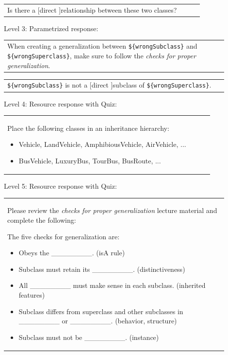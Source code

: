 \begin{tabular}{|p{0.9\linewidth}}
Is there a [direct ]relationship between these two classes?
\end{tabular} \medskip

\noindent Level 3: Parametrized response: \medskip

\begin{tabular}{|p{0.9\linewidth}}
When creating a generalization between \verb|${wrongSubclass}| and \verb|${wrongSuperclass}|, make sure to follow the \textit{checks for proper generalization}.
\end{tabular} \medskip

\begin{tabular}{|p{0.9\linewidth}}
\verb|${wrongSubclass}| is not a [direct ]subclass of \verb|${wrongSuperclass}|.
\end{tabular} \medskip

\noindent Level 4: Resource response with Quiz: \medskip

\begin{tabular}{|p{0.9\linewidth}}
Place the following classes in an inheritance hierarchy:

\begin{itemize}
    \item Vehicle, LandVehicle, AmphibiousVehicle, AirVehicle, ...
    \item BusVehicle, LuxuryBus, TourBus, BusRoute, ...
\end{itemize}

\end{tabular} \medskip

\noindent Level 5: Resource response with Quiz: \medskip

\begin{tabular}{|p{0.9\linewidth}}
Please review the \textit{checks for proper generalization} lecture material
and complete the following:

The five checks for generalization are:
\begin{itemize}
    \item Obeys the \_\_\_\_\_\_\_\_. (isA rule)
    \item Subclass must retain its \_\_\_\_\_\_\_\_. (distinctiveness)
    \item All \_\_\_\_\_\_\_\_ must make sense in each subclass. (inherited features)
    \item Subclass differs from superclass and other subclasses in \_\_\_\_\_\_\_\_ or \_\_\_\_\_\_\_\_. (behavior, structure)
    \item Subclass must not be \_\_\_\_\_\_\_\_. (instance)
\end{itemize}

\end{tabular} \medskip


